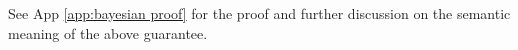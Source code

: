 \vspace{-1em}
See App \ref{app:bayesian proof} for the proof and further discussion on the semantic meaning of the above guarantee. 

